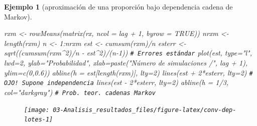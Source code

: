 \documentclass[
]{book}
\newenvironment{Shaded}{\begin{snugshade}}{\end{snugshade}}
\newcommand{\AttributeTok}[1]{\textcolor[rgb]{0.77,0.63,0.00}{#1}}
\newcommand{\CommentTok}[1]{\textcolor[rgb]{0.56,0.35,0.01}{\textit{#1}}}
\newcommand{\ConstantTok}[1]{\textcolor[rgb]{0.00,0.00,0.00}{#1}}
\newcommand{\DecValTok}[1]{\textcolor[rgb]{0.00,0.00,0.81}{#1}}
\newcommand{\FloatTok}[1]{\textcolor[rgb]{0.00,0.00,0.81}{#1}}
\newcommand{\FunctionTok}[1]{\textcolor[rgb]{0.00,0.00,0.00}{#1}}
\newcommand{\NormalTok}[1]{#1}
\newcommand{\OtherTok}[1]{\textcolor[rgb]{0.56,0.35,0.01}{#1}}
\newcommand{\SpecialCharTok}[1]{\textcolor[rgb]{0.00,0.00,0.00}{#1}}
\newcommand{\StringTok}[1]{\textcolor[rgb]{0.31,0.60,0.02}{#1}}
\theoremstyle{break}
\newtheorem{example}{Ejemplo}[chapter]
\theoremstyle{nonumberplain}
\renewcommand{\CommentTok}[1]{\textcolor[rgb]{0.41,0.41,0.41}{\texttt{#1}}}
\begin{document}
\begin{example}[aproximación de una proporción bajo dependencia cadena de Markov]
\begin{Shaded}
\begin{Highlighting}[]
\NormalTok{rxm }\OtherTok{\textless{}{-}} \FunctionTok{rowMeans}\NormalTok{(}\FunctionTok{matrix}\NormalTok{(rx, }\AttributeTok{ncol =}\NormalTok{ lag }\SpecialCharTok{+} \DecValTok{1}\NormalTok{, }\AttributeTok{byrow =} \ConstantTok{TRUE}\NormalTok{))}
\NormalTok{nrxm }\OtherTok{\textless{}{-}} \FunctionTok{length}\NormalTok{(rxm)}
\NormalTok{n }\OtherTok{\textless{}{-}} \DecValTok{1}\SpecialCharTok{:}\NormalTok{nrxm}
\NormalTok{est }\OtherTok{\textless{}{-}} \FunctionTok{cumsum}\NormalTok{(rxm)}\SpecialCharTok{/}\NormalTok{n}
\NormalTok{esterr }\OtherTok{\textless{}{-}} \FunctionTok{sqrt}\NormalTok{((}\FunctionTok{cumsum}\NormalTok{(rxm}\SpecialCharTok{\^{}}\DecValTok{2}\NormalTok{)}\SpecialCharTok{/}\NormalTok{n }\SpecialCharTok{{-}}\NormalTok{ est}\SpecialCharTok{\^{}}\DecValTok{2}\NormalTok{)}\SpecialCharTok{/}\NormalTok{(n}\DecValTok{{-}1}\NormalTok{)) }\CommentTok{\# Errores estándar}
\FunctionTok{plot}\NormalTok{(est, }\AttributeTok{type=}\StringTok{"l"}\NormalTok{, }\AttributeTok{lwd=}\DecValTok{2}\NormalTok{, }\AttributeTok{ylab=}\StringTok{"Probabilidad"}\NormalTok{, }
     \AttributeTok{xlab=}\FunctionTok{paste}\NormalTok{(}\StringTok{"Número de simulaciones /"}\NormalTok{, lag }\SpecialCharTok{+} \DecValTok{1}\NormalTok{), }\AttributeTok{ylim=}\FunctionTok{c}\NormalTok{(}\DecValTok{0}\NormalTok{,}\FloatTok{0.6}\NormalTok{))}
\FunctionTok{abline}\NormalTok{(}\AttributeTok{h =}\NormalTok{ est[}\FunctionTok{length}\NormalTok{(rxm)], }\AttributeTok{lty=}\DecValTok{2}\NormalTok{)}
\FunctionTok{lines}\NormalTok{(est }\SpecialCharTok{+} \DecValTok{2}\SpecialCharTok{*}\NormalTok{esterr, }\AttributeTok{lty=}\DecValTok{2}\NormalTok{) }\CommentTok{\# OJO! Supone independencia}
\FunctionTok{lines}\NormalTok{(est }\SpecialCharTok{{-}} \DecValTok{2}\SpecialCharTok{*}\NormalTok{esterr, }\AttributeTok{lty=}\DecValTok{2}\NormalTok{)}
\FunctionTok{abline}\NormalTok{(}\AttributeTok{h =} \DecValTok{1}\SpecialCharTok{/}\DecValTok{3}\NormalTok{, }\AttributeTok{col=}\StringTok{"darkgray"}\NormalTok{)     }\CommentTok{\# Prob. teor. cadenas Markov}
\end{Highlighting}
\end{Shaded}

\begin{figure}[!htb]

{\centering \texttt{[image: 03-Analisis\_resultados\_files/figure-latex/conv-dep-lotes-1]} 

}


\end{figure}
\end{example}
\end{document}
